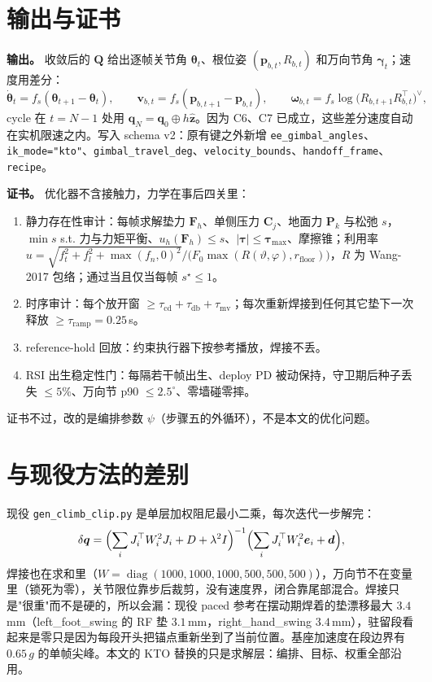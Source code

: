 \documentclass[11pt]{article}
\newcommand{\code}[1]{\texttt{\small #1}}
\newcommand{\dq}{\delta\bm q}
\newcommand{\zhat}{\hat{\bm z}}
\DeclareMathOperator{\diag}{diag}
\begin{document}
\section{输出与证书}

\textbf{输出。} 收敛后的 $\bm Q$ 给出逐帧关节角 $\bm\theta_t$、根位姿 $(\bm p_{b,t},R_{b,t})$ 和万向节角 $\bm\gamma_t$；速度用差分：
\begin{equation}
\dot{\bm\theta}_t=f_s(\bm\theta_{t+1}-\bm\theta_t),\qquad
\bm v_{b,t}=f_s(\bm p_{b,t+1}-\bm p_{b,t}),\qquad
\bm\omega_{b,t}=f_s\log\bigl(R_{b,t+1}R_{b,t}^{\top}\bigr)^{\vee},
\end{equation}
cycle 在 $t=N-1$ 处用 $\bm q_N=\bm q_0\oplus h\zhat$。因为 C6、C7 已成立，这些差分速度自动在实机限速之内。写入 schema v2：原有键之外新增 \code{ee\_gimbal\_angles}、\code{ik\_mode="kto"}、\code{gimbal\_travel\_deg}、\code{velocity\_bounds}、\code{handoff\_frame}、\code{recipe}。

\textbf{证书。} 优化器不含接触力，力学在事后四关里：
\begin{enumerate}[leftmargin=1.8em]
\item 静力存在性审计：每帧求解垫力 $\bm F_h$、单侧压力 $\bm C_j$、地面力 $\bm P_k$ 与松弛 $s$，$\min s$ s.t. 力与力矩平衡、$u_h(\bm F_h)\le s$、$|\bm\tau|\le\bm\tau_{\max}$、摩擦锥；利用率
$u=\sqrt{f_t^2+f_l^2+\max(f_n,0)^2}\big/\bigl(F_0\max(R(\vartheta,\varphi),r_{\mathrm{floor}})\bigr)$，$R$ 为 Wang-2017 包络；通过当且仅当每帧 $s^\star\le1$。
\item 时序审计：每个放开窗 $\ge\tau_{\mathrm{cd}}+\tau_{\mathrm{db}}+\tau_{\mathrm{mv}}$；每次重新焊接到任何其它垫下一次释放 $\ge\tau_{\mathrm{ramp}}=0.25$\,s。
\item reference-hold 回放：约束执行器下按参考播放，焊接不丢。
\item RSI 出生稳定性门：每隔若干帧出生、deploy PD 被动保持，守卫期后种子丢失 $\le5\%$、万向节 p90 $\le2.5^\circ$、零墙碰零摔。
\end{enumerate}
证书不过，改的是编排参数 $\psi$（步骤五的外循环），不是本文的优化问题。

\section{与现役方法的差别}

现役 \code{gen\_climb\_clip.py} 是单层加权阻尼最小二乘，每次迭代一步解完：
\begin{equation}
\dq=\Bigl(\sum_i J_i^{\top}W_i^2J_i+D+\lambda^2I\Bigr)^{-1}\Bigl(\sum_i J_i^{\top}W_i^2\bm e_i+\bm d\Bigr),
\end{equation}
焊接也在求和里（$W=\diag(1000,1000,1000,500,500,500)$），万向节不在变量里（锁死为零），关节限位靠步后裁剪，没有速度界，闭合靠尾部混合。焊接只是"很重"而不是硬的，所以会漏：现役 paced 参考在摆动期焊着的垫漂移最大 $3.4$\,mm（left\_foot\_swing 的 RF 垫 $3.1$\,mm，right\_hand\_swing $3.4$\,mm），驻留段看起来是零只是因为每段开头把锚点重新坐到了当前位置。基座加速度在段边界有 $0.65\,g$ 的单帧尖峰。本文的 KTO 替换的只是求解层：编排、目标、权重全部沿用。
\end{document}
